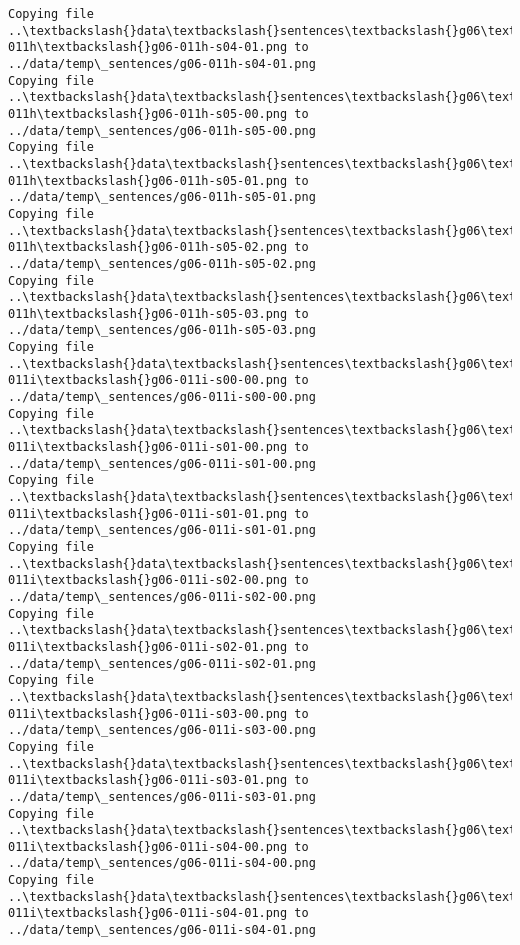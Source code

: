\documentclass[11pt]{article}
\begin{document}
\begin{Verbatim}[commandchars=\\\{\}]
Copying file ..\textbackslash{}data\textbackslash{}sentences\textbackslash{}g06\textbackslash{}g06-011h\textbackslash{}g06-011h-s04-01.png to
../data/temp\_sentences/g06-011h-s04-01.png
Copying file ..\textbackslash{}data\textbackslash{}sentences\textbackslash{}g06\textbackslash{}g06-011h\textbackslash{}g06-011h-s05-00.png to
../data/temp\_sentences/g06-011h-s05-00.png
Copying file ..\textbackslash{}data\textbackslash{}sentences\textbackslash{}g06\textbackslash{}g06-011h\textbackslash{}g06-011h-s05-01.png to
../data/temp\_sentences/g06-011h-s05-01.png
Copying file ..\textbackslash{}data\textbackslash{}sentences\textbackslash{}g06\textbackslash{}g06-011h\textbackslash{}g06-011h-s05-02.png to
../data/temp\_sentences/g06-011h-s05-02.png
Copying file ..\textbackslash{}data\textbackslash{}sentences\textbackslash{}g06\textbackslash{}g06-011h\textbackslash{}g06-011h-s05-03.png to
../data/temp\_sentences/g06-011h-s05-03.png
Copying file ..\textbackslash{}data\textbackslash{}sentences\textbackslash{}g06\textbackslash{}g06-011i\textbackslash{}g06-011i-s00-00.png to
../data/temp\_sentences/g06-011i-s00-00.png
Copying file ..\textbackslash{}data\textbackslash{}sentences\textbackslash{}g06\textbackslash{}g06-011i\textbackslash{}g06-011i-s01-00.png to
../data/temp\_sentences/g06-011i-s01-00.png
Copying file ..\textbackslash{}data\textbackslash{}sentences\textbackslash{}g06\textbackslash{}g06-011i\textbackslash{}g06-011i-s01-01.png to
../data/temp\_sentences/g06-011i-s01-01.png
Copying file ..\textbackslash{}data\textbackslash{}sentences\textbackslash{}g06\textbackslash{}g06-011i\textbackslash{}g06-011i-s02-00.png to
../data/temp\_sentences/g06-011i-s02-00.png
Copying file ..\textbackslash{}data\textbackslash{}sentences\textbackslash{}g06\textbackslash{}g06-011i\textbackslash{}g06-011i-s02-01.png to
../data/temp\_sentences/g06-011i-s02-01.png
Copying file ..\textbackslash{}data\textbackslash{}sentences\textbackslash{}g06\textbackslash{}g06-011i\textbackslash{}g06-011i-s03-00.png to
../data/temp\_sentences/g06-011i-s03-00.png
Copying file ..\textbackslash{}data\textbackslash{}sentences\textbackslash{}g06\textbackslash{}g06-011i\textbackslash{}g06-011i-s03-01.png to
../data/temp\_sentences/g06-011i-s03-01.png
Copying file ..\textbackslash{}data\textbackslash{}sentences\textbackslash{}g06\textbackslash{}g06-011i\textbackslash{}g06-011i-s04-00.png to
../data/temp\_sentences/g06-011i-s04-00.png
Copying file ..\textbackslash{}data\textbackslash{}sentences\textbackslash{}g06\textbackslash{}g06-011i\textbackslash{}g06-011i-s04-01.png to
../data/temp\_sentences/g06-011i-s04-01.png

\end{Verbatim}
\end{document}

